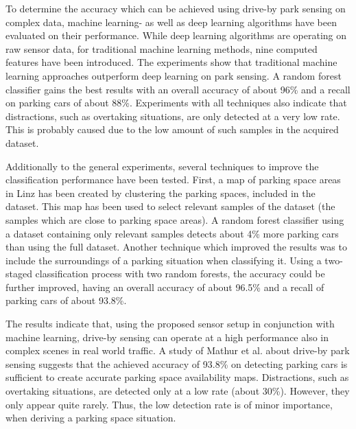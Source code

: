 

To determine the accuracy which can be achieved using drive-by park sensing on complex data, machine learning- as well as deep learning algorithms have been evaluated on their performance. While deep learning algorithms are operating on raw sensor data, for traditional machine learning methods, nine computed features have been introduced. The experiments show that traditional machine learning approaches outperform deep learning on park sensing. A random forest classifier gains the best results with an overall accuracy of about 96\% and a recall on parking cars of about 88\%. Experiments with all techniques also indicate that distractions, such as overtaking situations, are only detected at a very low rate. This is probably caused due to the low amount of such samples in the acquired dataset. 

Additionally to the general experiments, several techniques to improve the classification performance have been tested. First, a map of parking space areas in Linz has been created by clustering the parking spaces, included in the dataset. This map has been used to select relevant samples of the dataset (the samples which are close to parking space areas). A random forest classifier using a dataset containing only relevant samples detects about 4\% more parking cars than using the full dataset. Another technique which improved the results was to include the surroundings of a parking situation when classifying it. Using a two-staged classification process with two random forests, the accuracy could be further improved, having an overall accuracy of about 96.5\% and a recall of parking cars of about 93.8\%.

The results indicate that, using the proposed sensor setup in conjunction with machine learning, drive-by sensing can operate at a high performance also in complex scenes in real world traffic. 
A study of Mathur et al. about drive-by park sensing \cite{Mathur:2010:PDS:1814433.1814448} suggests that the achieved accuracy of 93.8\% on detecting parking cars is sufficient to create accurate parking space availability maps.
Distractions, such as overtaking situations, are detected only at a low rate (about 30\%). However, they only appear quite rarely. Thus, the low detection rate is of minor importance, when deriving a parking space situation.

